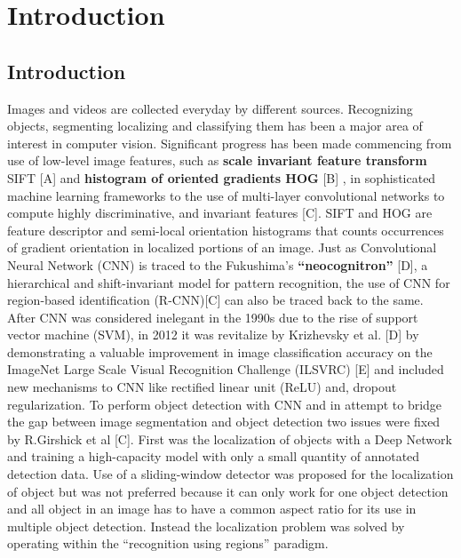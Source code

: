 
\chapter{Introduction}\label{ch:INTRO}



\section{Introduction}\label{sec:INTRO:ml}

Images and videos are collected everyday by different sources. Recognizing objects, segmenting localizing and classifying them has been a major area of interest in computer vision. Significant progress has been made commencing from use of low-level image features, such as \textbf {scale invariant feature transform}  SIFT [A] and \textbf{ histogram of oriented gradients HOG }[B] , in sophisticated machine learning frameworks to the use of multi-layer convolutional networks to compute highly discriminative, and invariant features [C]. SIFT and HOG are feature descriptor and semi-local orientation histograms that counts occurrences of gradient orientation in localized portions of an image. Just as Convolutional Neural Network (CNN) is traced to the Fukushima’s \textbf{ “neocognitron”} [D], a hierarchical and shift-invariant model for pattern recognition, the use of CNN for region-based identification (R-CNN)[C] can also be traced back to the same.  After CNN was considered inelegant in the 1990s due to the rise of support vector machine (SVM), in 2012 it was revitalize by Krizhevsky et al. [D] by demonstrating a valuable improvement in image classification accuracy on the ImageNet Large Scale Visual Recognition Challenge (ILSVRC) [E] and included new mechanisms to CNN like rectified linear unit (ReLU) and, dropout regularization. To perform object detection with CNN and in attempt to bridge the gap between image segmentation and object detection two issues were fixed by R.Girshick et al [C]. First was the localization of objects with a
Deep Network and training a high-capacity model with only a small quantity of annotated detection
data. Use of a sliding-window detector was proposed for the localization of object but was not preferred because it can only work for one object detection and all object in an image has to have a common aspect ratio for its use in multiple object detection. Instead the localization problem was solved by operating within the “recognition using regions” paradigm.

